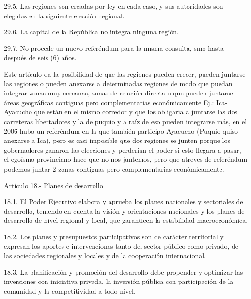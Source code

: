 \documentclass[
  jou,
  floatsintext,
  longtable,
  a4paper,
  nolmodern,
  notxfonts,
  notimes,
  12pt,
  colorlinks=true,linkcolor=blue,citecolor=blue,urlcolor=blue]{apa7}
\begin{document}
29.5. Las regiones son creadas por ley en cada caso, y sus autoridades
son elegidas en la siguiente elección regional.

29.6. La capital de la República no integra ninguna región.

29.7. No procede un nuevo referéndum para la misma consulta, sino hasta
después de seis (6) años.

Este artículo da la posibilidad de que las regiones pueden crecer,
pueden juntarse las regiones o pueden anexarse a determinadas regiones
de modo que puedan integrar zonas muy cercanas, zonas de relación
directa o que pueden juntarse áreas geográficas contiguas pero
complementarias económicamente Ej.: Ica-Ayacucho que están en el mismo
corredor y que los obligaría a juntarse las dos carreteras libertadores
y la de puquio y a raíz de eso pueden integrarse más, en el 2006 hubo un
referéndum en la que también participo Ayacucho (Puquio quiso anexarse a
Ica), pero es casi imposible que dos regiones se junten porque los
gobernadores ganaron las elecciones y perderían el poder si esto llegara
a pasar, el egoísmo provinciano hace que no nos juntemos, pero que
atreves de referéndum podemos juntar 2 zonas contiguas pero
complementarias económicamente.

Artículo 18.- Planes de desarrollo

18.1. El Poder Ejecutivo elabora y aprueba los planes nacionales y
sectoriales de desarrollo, teniendo en cuenta la visión y orientaciones
nacionales y los planes de desarrollo de nivel regional y local, que
garanticen la estabilidad macroeconómica.

18.2. Los planes y presupuestos participativos son de carácter
territorial y expresan los aportes e intervenciones tanto del sector
público como privado, de las sociedades regionales y locales y de la
cooperación internacional.

18.3. La planificación y promoción del desarrollo debe propender y
optimizar las inversiones con iniciativa privada, la inversión pública
con participación de la comunidad y la competitividad a todo nivel.
\end{document}
